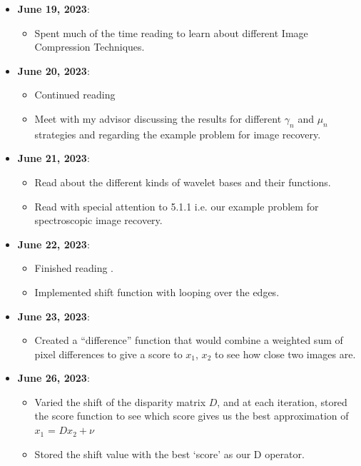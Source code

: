 \documentclass[a4paper,11pt,fleqn]{article}
\theoremstyle{plain}{\theorembodyfont{\rmfamily}%
\newtheorem{conjecture}[theorem]{Conjecture}}
\theoremstyle{plain}{\theorembodyfont{\rmfamily}%
\newtheorem{example}[theorem]{Example}}
\theoremstyle{plain}{\theorembodyfont{\rmfamily}%
\newtheorem{remark}[theorem]{Remark}}
\theoremstyle{plain}{\theorembodyfont{\rmfamily}%
\newtheorem{algorithm}[theorem]{Algorithm}}
\theoremstyle{plain}{\theorembodyfont{\rmfamily}%
\newtheorem{condition}[theorem]{Condition}}
\theoremstyle{plain}{\theorembodyfont{\rmfamily}%
\newtheorem{definition}[theorem]{Definition}}
\theoremstyle{plain}{\theorembodyfont{\rmfamily}
\newtheorem{fact}[theorem]{Fact}}
\theoremstyle{plain}{\theorembodyfont{\rmfamily}
\newtheorem{problem}[theorem]{Problem}}
\theoremstyle{plain}{\theorembodyfont{\rmfamily}
\newtheorem{notation}[theorem]{Notation}}
\theoremstyle{plain}{\theorembodyfont{\rmfamily}
\newtheorem{project}[theorem]{Project}}
\begin{document}
\begin{itemize}
\item {\bf June 19, 2023}:
\begin{itemize} 
\item Spent much of the time reading \cite{ImageCompressionHussain} to learn about different Image Compression Techniques.
\end{itemize}

\item {\bf June 20, 2023}:
\begin{itemize} 
\item Continued reading \cite{ImageCompressionHussain}
\item Meet with my advisor discussing the results for different $\gamma_n$ and $\mu_n$ strategies and regarding the example problem for image recovery.
\end{itemize}

\item {\bf June 21, 2023}:
\begin{itemize} 
\item Read about the different kinds of wavelet bases and their functions.
\item Read \cite{ImageRecoveryPCombettes} with special attention to 5.1.1 i.e. our example problem for spectroscopic image recovery.
\end{itemize}

\item {\bf June 22, 2023}:
\begin{itemize} 
\item Finished reading \cite{ImageRecoveryPCombettes}.
\item Implemented shift function with looping over the edges.
\end{itemize}

\item {\bf June 23, 2023}:
\begin{itemize} 
\item Created a ``difference'' function that would combine a weighted sum of pixel differences to give a score to $x_1$, $x_2$ to see how close two images are.
\end{itemize}

\item {\bf June 26, 2023}:
\begin{itemize} 
\item Varied the shift of the disparity matrix $D$, and at each iteration, stored the score function to see which score gives us the best approximation of $x_1$ = $Dx_2 + \nu$
\item Stored the shift value with the best `score' as our D operator. 
\end{itemize}


\end{itemize}
\end{document}
